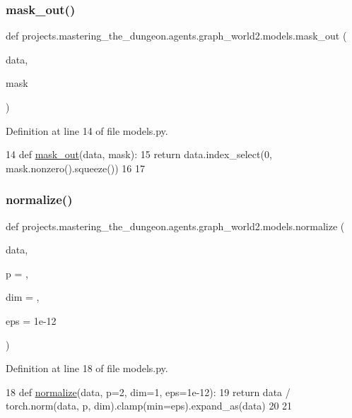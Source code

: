 \subsubsection{\texorpdfstring{mask\+\_\+out()}{mask\_out()}}
{\footnotesize\ttfamily def projects.\+mastering\+\_\+the\+\_\+dungeon.\+agents.\+graph\+\_\+world2.\+models.\+mask\+\_\+out (\begin{DoxyParamCaption}\item[{}]{data,  }\item[{}]{mask }\end{DoxyParamCaption})}



Definition at line 14 of file models.\+py.


\begin{DoxyCode}
14 \textcolor{keyword}{def }\hyperlink{namespaceprojects_1_1mastering__the__dungeon_1_1agents_1_1graph__world2_1_1models_a7a25e3f344ab4c672afacbf512130890}{mask\_out}(data, mask):
15     \textcolor{keywordflow}{return} data.index\_select(0, mask.nonzero().squeeze())
16 
17 
\end{DoxyCode}
\mbox{\label{namespaceprojects_1_1mastering__the__dungeon_1_1agents_1_1graph__world2_1_1models_a078f3c710f6afc6a50e933e55ed4259a}} 
\subsubsection{\texorpdfstring{normalize()}{normalize()}}
{\footnotesize\ttfamily def projects.\+mastering\+\_\+the\+\_\+dungeon.\+agents.\+graph\+\_\+world2.\+models.\+normalize (\begin{DoxyParamCaption}\item[{}]{data,  }\item[{}]{p = {},  }\item[{}]{dim = {},  }\item[{}]{eps = {\ttfamily 1e-\/12} }\end{DoxyParamCaption})}



Definition at line 18 of file models.\+py.


\begin{DoxyCode}
18 \textcolor{keyword}{def }\hyperlink{namespaceprojects_1_1mastering__the__dungeon_1_1agents_1_1graph__world2_1_1models_a078f3c710f6afc6a50e933e55ed4259a}{normalize}(data, p=2, dim=1, eps=1e-12):
19     \textcolor{keywordflow}{return} data / torch.norm(data, p, dim).clamp(min=eps).expand\_as(data)
20 
21 
\end{DoxyCode}
